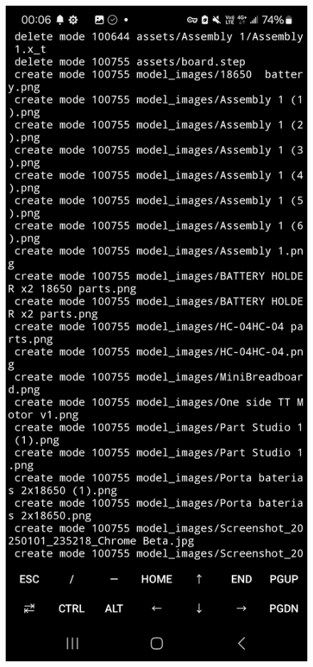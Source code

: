 \documentclass[a4paper,12pt]{article}
\begin{document}
\begin{center}
\begin{figure}[H]
\begin{minipage}[t]{0.45\textwidth}
\end{minipage}
\hfill
\begin{minipage}[t]{0.45\textwidth}
\centering
\includegraphics[width=\textwidth]{./working_screenshots/2.jpg}
\end{minipage}
\hfill
\end{figure}\FloatBarrier\end{center}
\end{document}
